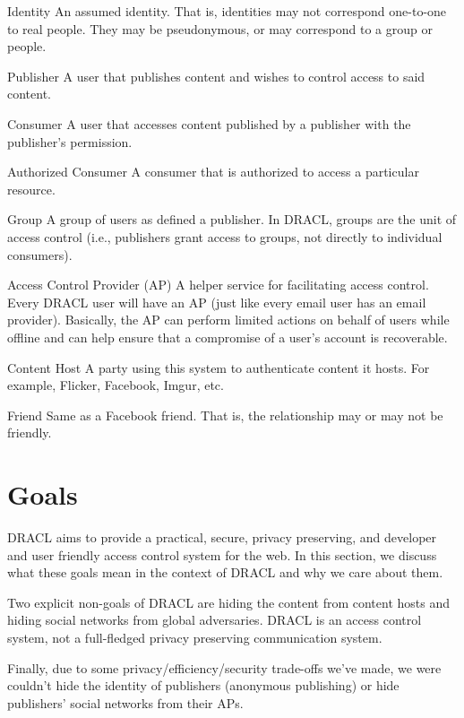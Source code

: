 \documentclass[pdftex,12pt,a4papaer]{report}
\begin{document}
\begin{compactdesc}
    \item[Identity] An assumed identity. That is, identities may not correspond
      one-to-one to real people. They may be pseudonymous, or may correspond to
      a group or people.
    \item[Publisher] A user that publishes content and wishes to control
      access to said content.
    \item[Consumer] A user that accesses content published by a publisher
      with the publisher's permission.
    \item[Authorized Consumer] A consumer that is authorized to access a
      particular resource.
    \item[Group] A group of users as defined a publisher. In DRACL, groups
      are the unit of access control (i.e., publishers grant access to
      groups, not directly to individual consumers).
    \item[Access Control Provider (AP)] A helper service for facilitating
      access control. Every DRACL user will have an AP (just like every email
      user has an email provider). Basically, the AP can perform limited actions on
      behalf of users while offline and can help ensure that a compromise of a user's
      account is recoverable.
    \item[Content Host] A party using this system to authenticate content it
      hosts. For example, Flicker, Facebook, Imgur, etc.
    \item[Friend] Same as a Facebook friend. That is, the relationship may or
      may not be friendly.
\end{compactdesc}

\section{Goals}

DRACL aims to provide a practical, secure, privacy preserving, and developer and
user friendly access control system for the web. In this section, we discuss
what these goals mean in the context of DRACL and why we care about them.

Two explicit non-goals of DRACL are hiding the content from content hosts and
hiding social networks from global adversaries. DRACL is an access control
system, not a full-fledged privacy preserving communication system.

Finally, due to some privacy/efficiency/security trade-offs we've made, we were
couldn't hide the identity of publishers (anonymous publishing) or hide
publishers' social networks from their APs.
\end{document}
